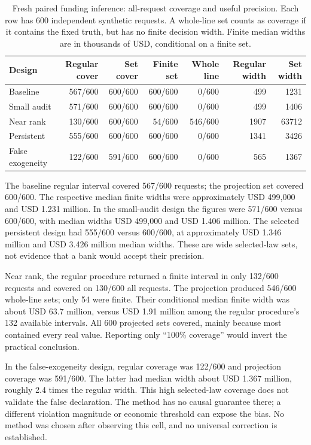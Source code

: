 \begin{table}[htbp]
\centering\small
\caption{Fresh paired funding inference: all-request coverage and useful precision. Each row has 600 independent synthetic requests. A whole-line set counts as coverage if it contains the fixed truth, but has no finite decision width. Finite median widths are in thousands of USD, conditional on a finite set.}
\label{integrated:weak_audit_projection:tab:weak-audit-results}
\begin{tabular}{lrrrrrr}
\toprule
Design & Regular cover & Set cover & Finite set & Whole line & Regular width & Set width \\
\midrule
Baseline & 567/600 & 600/600 & 600/600 & 0/600 & 499 & 1231 \\
Small audit & 571/600 & 600/600 & 600/600 & 0/600 & 499 & 1406 \\
Near rank & 130/600 & 600/600 & 54/600 & 546/600 & 1907 & 63712 \\
Persistent & 555/600 & 600/600 & 600/600 & 0/600 & 1341 & 3426 \\
False exogeneity & 122/600 & 591/600 & 600/600 & 0/600 & 565 & 1367 \\
\bottomrule
\end{tabular}
\end{table}


The baseline regular interval covered 567/600 requests; the projection set
covered 600/600. The respective median finite widths were approximately
USD 499,000 and USD 1.231 million. In the small-audit design the figures were
571/600 versus 600/600, with median widths USD 499,000 and USD 1.406 million.
The selected persistent design had 555/600 versus 600/600, at approximately
USD 1.346 million and USD 3.426 million median widths. These are wide
selected-law sets, not evidence that a bank would accept their precision.

Near rank, the regular procedure returned a finite interval in only 132/600
requests and covered on 130/600 all requests. The projection produced 546/600
whole-line sets; only 54 were finite. Their conditional median finite width
was about USD 63.7 million, versus USD 1.91 million among the regular
procedure's 132 available intervals. All 600 projected sets covered, mainly
because most contained every real value. Reporting only ``100\% coverage''
would invert the practical conclusion.

In the false-exogeneity design, regular coverage was 122/600 and projection
coverage was 591/600. The latter had median width about USD 1.367 million,
roughly 2.4 times the regular width. This high selected-law coverage does not
validate the false declaration. The method has no causal guarantee there;
a different violation magnitude or economic threshold can expose the bias.
No method was chosen after observing this cell, and no universal correction
is established.

